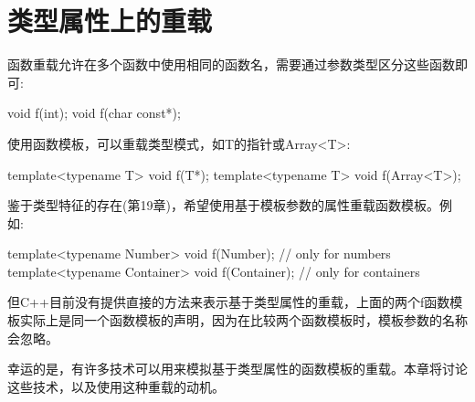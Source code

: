 \chapter{类型属性上的重载}

函数重载允许在多个函数中使用相同的函数名，需要通过参数类型区分这些函数即可:

\begin{cpp}
void f(int);
void f(char const*);
\end{cpp}

使用函数模板，可以重载类型模式，如T的指针或Array<T>:

\begin{cpp}
template<typename T> void f(T*);
template<typename T> void f(Array<T>);
\end{cpp}

鉴于类型特征的存在(第19章)，希望使用基于模板参数的属性重载函数模板。例如:

\begin{cpp}
template<typename Number> void f(Number); // only for numbers
template<typename Container> void f(Container); // only for containers
\end{cpp}

但C++目前没有提供直接的方法来表示基于类型属性的重载，上面的两个f函数模板实际上是同一个函数模板的声明，因为在比较两个函数模板时，模板参数的名称会忽略。

幸运的是，有许多技术可以用来模拟基于类型属性的函数模板的重载。本章将讨论这些技术，以及使用这种重载的动机。





































